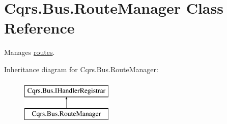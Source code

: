 \hypertarget{classCqrs_1_1Bus_1_1RouteManager}{}\section{Cqrs.\+Bus.\+Route\+Manager Class Reference}
\label{classCqrs_1_1Bus_1_1RouteManager}


Manages \hyperlink{classCqrs_1_1Bus_1_1Route}{routes}.  


Inheritance diagram for Cqrs.\+Bus.\+Route\+Manager\+:\begin{figure}[H]
\begin{center}
\leavevmode
\includegraphics[height=2.000000cm]{classCqrs_1_1Bus_1_1RouteManager}
\end{center}
\end{figure}
